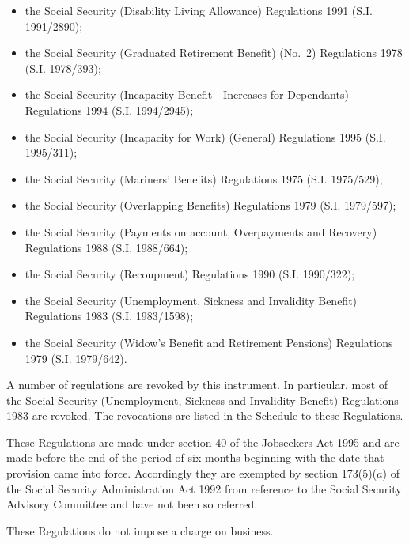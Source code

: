 \documentclass[a4paper]{article}
\begin{document}
\begin{itemize}
\item the Social Security (Disability Living Allowance) Regulations 1991 (S.I. 1991/2890);
\item the Social Security (Graduated Retirement Benefit) (No.\ 2) Regulations 1978 (S.I. 1978/393);
\item the Social Security (Incapacity Benefit—Increases for Dependants) Regulations 1994 (S.I. 1994/2945);
\item the Social Security (Incapacity for Work) (General) Regulations 1995 (S.I. 1995/311);
\item the Social Security (Mariners' Benefits) Regulations 1975 (S.I. 1975/529);
\item the Social Security (Overlapping Benefits) Regulations 1979 (S.I. 1979/\hspace{0pt}597);
\item the Social Security (Payments on account, Overpayments and Recovery) Regulations 1988 (S.I. 1988/664);
\item the Social Security (Recoupment) Regulations 1990 (S.I. 1990/322);
\item the Social Security (Unemployment, Sickness and Invalidity Benefit) Regulations 1983 (S.I. 1983/1598);
\item the Social Security (Widow’s Benefit and Retirement Pensions) Regulations 1979 (S.I. 1979/642).
\end{itemize}

  A number of regulations are revoked by this instrument. In particular, most of the Social Security (Unemployment, Sickness and Invalidity Benefit) Regulations 1983 are revoked. The revocations are listed in the Schedule to these Regulations.

  These Regulations are made under section 40 of the Jobseekers Act 1995 and are made before the end of the period of six months beginning with the date that provision came into force. Accordingly they are exempted by section 173(5)($a$) of the Social Security Administration Act 1992 from reference to the Social Security Advisory Committee and have not been so referred.

  These Regulations do not impose a charge on business.
\end{document}
